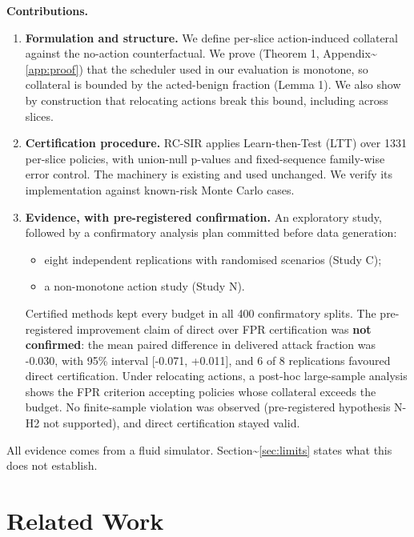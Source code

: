 \textbf{Contributions.}

\begin{enumerate}
\def\labelenumi{\arabic{enumi}.}
\tightlist
\item
  \textbf{Formulation and structure.} We define per-slice action-induced
  collateral against the no-action counterfactual. We prove (Theorem 1,
  Appendix\textasciitilde{}\ref{app:proof}) that the scheduler used in
  our evaluation is monotone, so collateral is bounded by the
  acted-benign fraction (Lemma 1). We also show by construction that
  relocating actions break this bound, including across slices.
\item
  \textbf{Certification procedure.} RC-SIR applies Learn-then-Test (LTT)
  \cite{angelopoulos2025ltt} over 1331 per-slice policies, with
  union-null p-values and fixed-sequence family-wise error control. The
  machinery is existing and used unchanged. We verify its implementation
  against known-risk Monte Carlo cases.
\item
  \textbf{Evidence, with pre-registered confirmation.} An exploratory
  study, followed by a confirmatory analysis plan committed before data
  generation:

  \begin{itemize}
  \tightlist
  \item
    eight independent replications with randomised scenarios (Study C);
  \item
    a non-monotone action study (Study N).
  \end{itemize}

  Certified methods kept every budget in all 400 confirmatory splits.
  The pre-registered improvement claim of direct over FPR certification
  was \textbf{not confirmed}: the mean paired difference in delivered
  attack fraction was -0.030, with 95\% interval {[}-0.071, +0.011{]},
  and 6 of 8 replications favoured direct certification. Under
  relocating actions, a post-hoc large-sample analysis shows the FPR
  criterion accepting policies whose collateral exceeds the budget. No
  finite-sample violation was observed (pre-registered hypothesis N-H2
  not supported), and direct certification stayed valid.
\end{enumerate}

All evidence comes from a fluid simulator.
Section\textasciitilde{}\ref{sec:limits} states what this does not
establish.

\hypertarget{sec:related}{%
\section{Related Work}\label{sec:related}}

